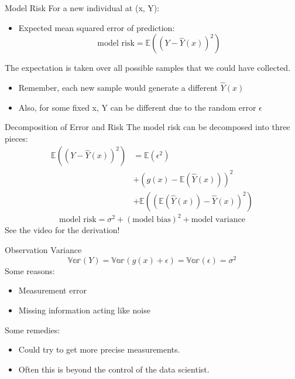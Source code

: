 \documentclass[aspectratio=169]{../latex_main/tntbeamer}  %
\begin{document}
		\begin{frame}{Model Risk}
	    For a new individual at (x, Y):
	    \begin{itemize}
	        \item Expected mean squared error of prediction:
	        \begin{equation*}
	            \text{model risk} = \mathbb{E}((Y-\hat{Y}(x))^2)
	        \end{equation*}
	    \end{itemize}
	    The expectation is taken over all possible samples that we could have collected.
	    \begin{itemize}
	        \item Remember, each new sample would generate a different $\hat{Y}(x)$
	        \item Also, for some fixed x, Y can be different due to the random error $\epsilon$
	    \end{itemize}
	\end{frame}
	
	
	\begin{frame}[c]{Decomposition of Error and Risk}
	    The model risk can be decomposed into three pieces:
	    \begin{align*}
	        \mathbb{E}((Y-\hat{Y}(x))^2) &= \mathbb{E}(\epsilon^2)\\
	        &+ (g(x) - \mathbb{E}(\hat{Y}(x)))^2\\
	        &+ \mathbb{E}((\mathbb{E}(\hat{Y}(x))-\hat{Y}(x))^2)
	    \end{align*}
	    \begin{equation*}
	        \text{model risk} = \sigma^2 + (\text{model bias})^2 + \text{model variance}
	    \end{equation*}
	    See the video for the derivation!
	\end{frame}
	
	
	\begin{frame}[c]{Observation Variance}
	    \begin{equation*}
	        \mathbb{Var}(Y) = \mathbb{Var}(g(x) + \epsilon) = \mathbb{Var}(\epsilon) = \sigma^2
	    \end{equation*}
	    Some reasons:
	    \begin{itemize}
	        \item Measurement error
	        \item Missing information acting like noise
	    \end{itemize}
	    \bigskip
	    Some remedies:
	    \begin{itemize}
	        \item Could try to get more precise measurements.
	        \item Often this is beyond the control of the data scientist.
	    \end{itemize}
	\end{frame}
	
\end{document}
